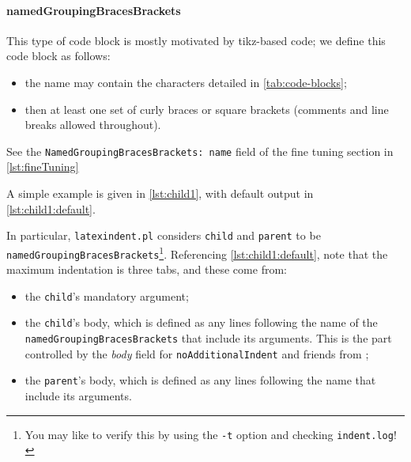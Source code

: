  \paragraph{namedGroupingBracesBrackets} This type of code block is mostly motivated by
  tikz-based code; we define this code block as follows:
  \begin{itemize}
   \item the name may contain the characters detailed in \vref{tab:code-blocks};
   \item then at least one set of curly braces or square brackets (comments and line
         breaks allowed throughout).
  \end{itemize}
  See the \texttt{NamedGroupingBracesBrackets: name} field of the fine tuning section in
  \vref{lst:fineTuning} %

  \begin{example}
  A simple example is given in \cref{lst:child1}, with default output in
  \cref{lst:child1:default}.

  \begin{cmhtcbraster}
  \end{cmhtcbraster}

  In particular, \texttt{latexindent.pl} considers \texttt{child} and \texttt{parent} to
  be \texttt{namedGroupingBracesBrackets}\footnote{ You may like to verify this by using
  the \texttt{-t} option and checking \texttt{indent.log}! }. Referencing
  \cref{lst:child1:default}, note that the maximum indentation is three tabs, and these
  come from:
  \begin{itemize}
   \item the \lstinline!child!'s mandatory argument;
   \item the \lstinline!child!'s body, which is defined as any lines following the name
         of the \texttt{namedGroupingBracesBrackets} that include its arguments. This is
         the part controlled by the \emph{body} field for \texttt{noAdditionalIndent} and
         friends from ;
   \item the \lstinline!parent!'s body, which is defined as any lines following the name
         that include its arguments.
  \end{itemize}
  \end{example}

